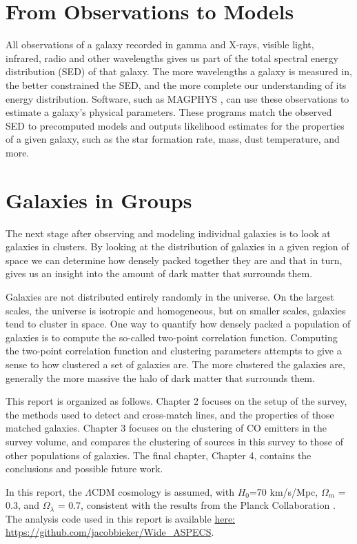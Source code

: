 \documentclass[twoside,single]{lion-msc}
\begin{document}
\section{From Observations to Models}

All observations of a galaxy recorded in gamma and X-rays, visible light, infrared, radio and other wavelengths gives us part of the total spectral energy distribution (SED) of that galaxy. The more wavelengths a galaxy is measured in, the better constrained the SED, and the more complete our understanding of its energy distribution. Software, such as MAGPHYS \cite{da2008simple, da2015alma}, can use these observations to estimate a galaxy's physical parameters. These programs match the observed SED to precomputed models and outputs likelihood estimates for the properties of a given galaxy, such as the star formation rate, mass, dust temperature, and more.

\section{Galaxies in Groups}

The next stage after observing and modeling individual galaxies is to look at galaxies in clusters. By looking at the distribution of galaxies in a given region of space we can determine how densely packed together they are and that in turn, gives us an insight into the amount of dark matter that surrounds them.

Galaxies are not distributed entirely randomly in the universe. On the largest scales, the universe is isotropic and homogeneous, but on smaller scales, galaxies tend to cluster in space. One way to quantify how densely packed a population of galaxies is to compute the so-called two-point correlation function. Computing the two-point correlation function and clustering parameters attempts to give a sense to how clustered a set of galaxies are. The more clustered the galaxies are, generally the more massive the halo of dark matter that surrounds them.

This report is organized as follows. Chapter 2 focuses on the setup of the survey, the methods used to detect and cross-match lines, and the properties of those matched galaxies. Chapter 3 focuses on the clustering of CO emitters in the survey volume, and compares the clustering of sources in this survey to those of other populations of galaxies. The final chapter, Chapter 4, contains the conclusions and possible future work. 

In this report, the $\Lambda$CDM cosmology is assumed, with $H_0$=70 km/s/Mpc, $\Omega_m$ = 0.3, and $\Omega_{\lambda}$ = 0.7, consistent with the results from the Planck Collaboration \cite{ade2016planck}. The analysis code used in this report is available \href{https://github.com/jacobbieker/Wide\_ASPECS}{here: https://github.com/jacobbieker/Wide\_ASPECS}. 
\end{document}
